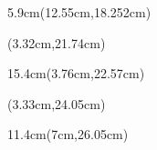\documentclass[a4paper]{article}
\begin{document}
\begin{Form}
\begin{textblock*}{5.9cm}(12.55cm,18.252cm) %
\noindent
\Nachweis
\end{textblock*}

\begin{textblock*}{0.38cm}(3.32cm,21.74cm) %
\end{textblock*}

\begin{textblock*}{15.4cm}(3.76cm,22.57cm) %
\noindent
\Faehigkeiten
\end{textblock*}

\begin{textblock*}{0.38cm}(3.33cm,24.05cm) %
\end{textblock*}

\begin{textblock*}{11.4cm}(7cm,26.05cm) %
\noindent
\FreiwilligeAngabe
\end{textblock*}

~\clearpage





\end{Form}
\end{document}
